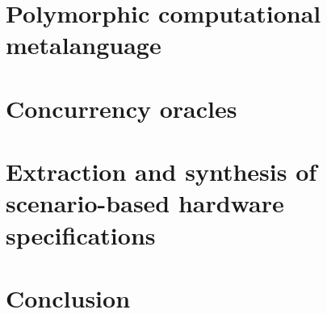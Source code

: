 \documentclass[runningheads]{llncs}
\begin{document}
\section{Polymorphic computational metalanguage\label{sec:metalanguage}}


\section{Concurrency oracles\label{sec:oracles}}


\section{Extraction and synthesis of scenario-based hardware specifications}


\section{Conclusion}

%
%
%

\end{document}
